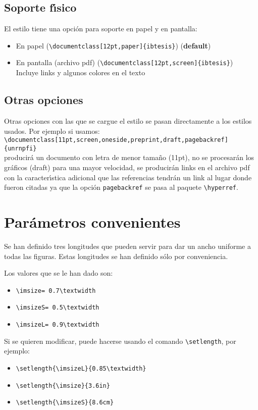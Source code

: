 \subsection*{Soporte f\'{\i}sico}

El estilo tiene una opci\'{o}n para soporte en papel y en pantalla:
\begin{itemize}
\item En papel (\verb|\documentclass[12pt,paper]{ibtesis}|) (\textbf{default})
\item En pantalla (archivo pdf) (\verb|\documentclass[12pt,screen]{ibtesis}|)\\
Incluye links y algunos colores en el texto
\end{itemize}

\subsection*{Otras opciones}
\label{S:otras-opciones}
Otras opciones con las que se cargue el estilo se pasan directamente a los estilos usados. Por ejemplo si usamos:\\
\verb|\documentclass[11pt,screen,oneside,preprint,draft,pagebackref]{unrnpfi}|\\
producir\'{a} un documento con letra de menor tama\~{n}o (11pt), no se procesar\'{a}n los gr\'{a}ficos (draft) para una mayor velocidad, se producir\'{a}n links en el archivo pdf con la caracter\'{\i}stica adicional que las referencias tendr\'{a}n un link al lugar donde fueron citadas ya que la opci\'{o}n \verb|pagebackref| se pasa al paquete \verb|\hyperref|.

\section{Par\'{a}metros convenientes}
\label{S:param-conv}

Se han definido tres longitudes que pueden servir para dar un ancho uniforme a todas las figuras.
Estas longitudes se han definido s\'{o}lo por conveniencia. 

Los valores que se le han dado son:
\begin{itemize}
\item \verb|\imsize= 0.7\textwidth|
\item \verb|\imsizeS= 0.5\textwidth|
\item \verb|\imsizeL= 0.9\textwidth|
\end{itemize}

Si se quieren modificar, puede hacerse usando el comando \verb|\setlength|, por ejemplo:
\begin{itemize}
\item \verb|\setlength{\imsizeL}{0.85\textwidth}|
\item \verb|\setlength{\imsize}{3.6in}|
\item \verb|\setlength{\imsizeS}{8.6cm}|
\end{itemize}

